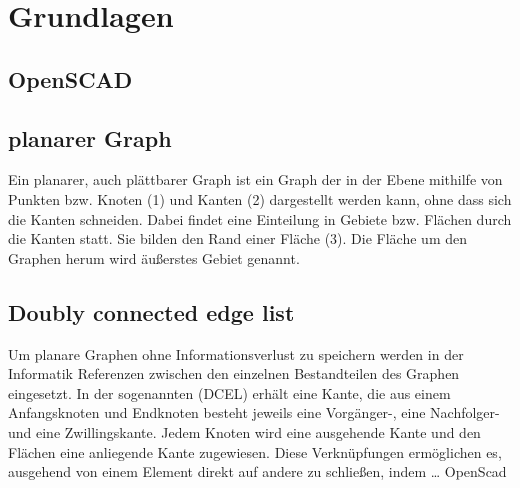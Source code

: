 \chapter{Grundlagen}
\section{OpenSCAD}
\section{planarer Graph}
Ein planarer, auch plättbarer Graph ist ein Graph der in der Ebene mithilfe von Punkten bzw. Knoten (1) und Kanten (2) dargestellt werden kann, ohne dass sich die Kanten schneiden. 
Dabei findet eine Einteilung in Gebiete bzw. Flächen durch die Kanten statt. 
Sie bilden den Rand einer Fläche (3). 
Die Fläche um den Graphen herum wird äußerstes Gebiet genannt.
\section{Doubly connected edge list}
Um planare Graphen ohne Informationsverlust zu speichern werden in der Informatik Referenzen zwischen den einzelnen Bestandteilen des Graphen eingesetzt. 
In der sogenannten  (DCEL) erhält eine Kante, die aus einem Anfangsknoten und Endknoten besteht jeweils eine Vorgänger-, eine Nachfolger- und eine Zwillingskante. 
Jedem Knoten wird eine ausgehende Kante und den Flächen eine anliegende Kante zugewiesen. Diese Verknüpfungen ermöglichen es, ausgehend von einem Element direkt auf andere zu schließen, indem  …
OpenScad
